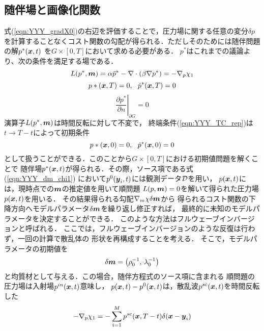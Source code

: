 \subsection{随伴場と画像化関数}
式(\ref{eqn:YYY_gradX0})の右辺を評価することで，圧力場に関する任意の変分$\delta p$
を計算することなくコスト関数の勾配が得られる．ただしそのためには随伴問題の解$p^*(\mbox{\boldmath $x$},t)$
を$G \times [0,T]$において求める必要がある．
$p^*$はこれまでの議論より、次の条件を満足する場である．
\begin{equation}
	L(p^*,\mbox{\boldmath $m$})=
	\alpha \ddot{p}^* -\nabla\cdot \left( \beta \nabla p^* \right)
	=	
	-\nabla_p\chi_1
	\label{eqn:YYY_adj_PDE_rep}
\end{equation}
\begin{equation}
	p*(\mbox{\boldmath $x$},T)=0, \ \ \dot{p}^*(\mbox{\boldmath $x$},T)=0
	\label{eqn:YYY_TC_rep}
\end{equation}
\begin{equation}
	\left. \frac{\partial p^*}{\partial n}\right|_{\partial G}=0
	\label{eqn:YYY_BC_rep}
\end{equation}
演算子$L(p^*,\mbox{\boldmath $m$})$は時間反転に対して不変で，
終端条件(\ref{eqn:YYY_TC_rep})は$t\rightarrow T-t$によって初期条件
\begin{equation}
	p*(\mbox{\boldmath $x$},0)=0, \ \ \dot{p}^*(\mbox{\boldmath $x$},0)=0
	\label{eqn:YYY_IC_adj}
\end{equation}
として扱うことができる．このことから$G\times [0,T]$における初期値問題を解くことで
随伴場$p^*(\mbox{\boldmath $x$},t)$が得られる．その際，ソース項である式(\ref{eqn:YYY_dm_chi1})
において$p^{0}(\mbox{\boldmath $y$}_i,t)$には観測データ${\cal D}$を用い，
$p(\mbox{\boldmath $x$},t)$には，現時点での$\mbox{\boldmath $m$}$の推定値を用いて順問題
$L(p,\mbox{\boldmath $m$})=0$を解いて得られた圧力場$p(\mbox{\boldmath $x$},t)$を用いる．
その結果得られる勾配$\nabla_m\chi \delta \mbox{\boldmath $m$}$から
得られるコスト関数の下降方向へモデルパラメータ$\delta \mbox{\boldmath $m$}$を繰り返し修正すれば，
最終的に未知のモデルパラメータを決定することができる．
このような方法はフルウェーブインバージョンと呼ばれる．
ここでは，フルウェーブインバージョンのような反復は行わず，一回の計算で散乱体の
形状を再構成することを考える．
そこで，モデルパラメータの初期値を
\begin{equation}
	\delta \mbox{\boldmath $m$}=\left(\rho_0^{-1},\, \lambda_0^{-1} \right)
	\label{eqn:YYY_16}
\end{equation}
と均質材として与える．この場合，随伴方程式のソース項に含まれる
順問題の圧力場は入射場$p^{in}(\mbox{\boldmath $x$},t)$意味し，
$p(\mbox{\boldmath $x$},t)-p^{0}(\mbox{\boldmath $x$},t)$は，散乱波$p^{sc}(\mbox{\boldmath $x$},t)$を時間反転した
\begin{equation}
	-\nabla_p\chi_1 = 
	-\sum_{i=1}^M p^{sc}(\mbox{\boldmath $x$},T-t)\delta(\mbox{\boldmath $x$}-\mbox{\boldmath $y$}_i)
	\label{eqn:YYY_17}
\end{equation}
